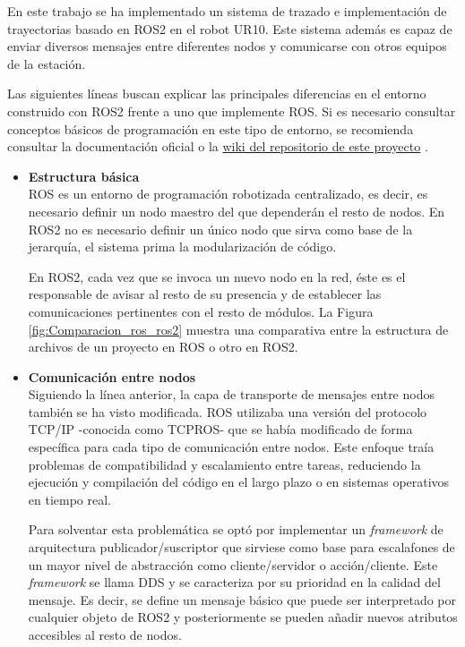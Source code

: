 En este trabajo se ha implementado un sistema de trazado e implementación de trayectorias basado en ROS2 en el robot UR10. Este sistema además es capaz de enviar diversos mensajes entre diferentes nodos y comunicarse con otros equipos de la estación. 

Las siguientes líneas buscan explicar las principales diferencias en el entorno construido con ROS2 frente a uno que implemente \acrshort{ROS}. Si es necesario consultar conceptos básicos de programación en este tipo de entorno, se recomienda consultar la documentación oficial \cite{ROS2_docu_humble} o la \href{\linkrepositorio}{wiki del  repositorio de este proyecto} \cite{repo_github_TFM_MiguelLerinAlonso}.

\begin{itemize}
    \item \textbf{Estructura básica}\\
    \acrshort{ROS} es un entorno de programación robotizada centralizado, es decir, es necesario definir un nodo maestro del que dependerán el resto de nodos. En ROS2 no es necesario definir un único nodo que sirva como base de la jerarquía, el sistema prima la modularización de código. 

    En ROS2, cada vez que se invoca un nuevo nodo en la red, éste es el responsable de avisar al resto de su presencia y de establecer las comunicaciones pertinentes con el resto de módulos. La Figura \ref{fig:Comparacion_ros_ros2} muestra una comparativa entre la estructura de archivos de un proyecto en ROS o otro en ROS2.
    
    \item \textbf{Comunicación entre nodos}\\
    Siguiendo la línea anterior, la capa de transporte de mensajes entre nodos también se ha visto modificada. ROS utilizaba una versión del protocolo \acrshort{TCP/IP} -conocida como TCPROS- que se había modificado de forma específica para cada tipo de comunicación entre nodos. Este enfoque traía problemas de compatibilidad y escalamiento entre tareas, reduciendo la ejecución y compilación del código en el largo plazo o en sistemas operativos en tiempo real.

    Para solventar esta problemática se optó por implementar un \textit{framework} de arquitectura publicador/suscriptor que sirviese como base para escalafones de un mayor nivel de abstracción como cliente/servidor o acción/cliente. Este \textit{framework} se llama \acrshort{DDS} \cite{ROS2_DDS} y se caracteriza por su prioridad en la calidad del mensaje. Es decir, se define un mensaje básico que puede ser interpretado por cualquier objeto de ROS2 y posteriormente se pueden añadir nuevos atributos accesibles al resto de nodos.
    

\end{itemize}
